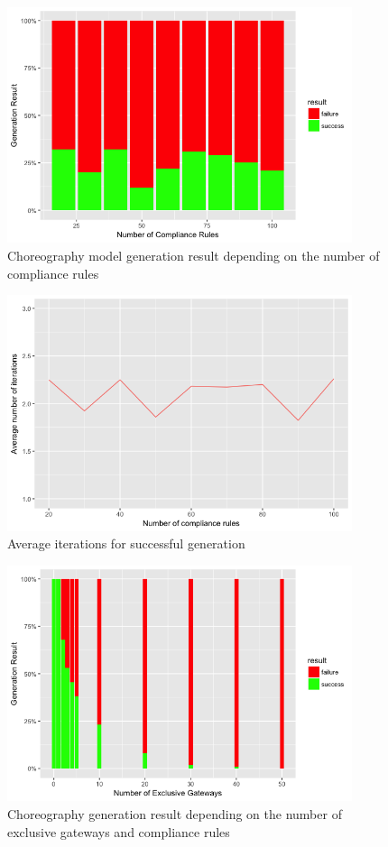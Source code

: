 \begin{figure}[htb]
\centering
\includegraphics[width=0.9\textwidth]{src/images/xors_build_result.png}
\caption{Choreography model generation result depending on the number of compliance rules}
\label{fig:anal_xors1}
\end{figure}

\begin{figure}[H]
\centering
\includegraphics[width=0.9\textwidth]{src/images/xors_build_it.png}
\caption{Average iterations for successful generation}
\label{fig:anal_xors2}
\end{figure}

\begin{figure}[H]
\centering 
\includegraphics[width=0.9\textwidth]{src/images/xors_build_var.png}
\caption{Choreography generation result depending on the number of exclusive gateways and compliance rules}
\label{fig:anal_xors3}
\end{figure}

